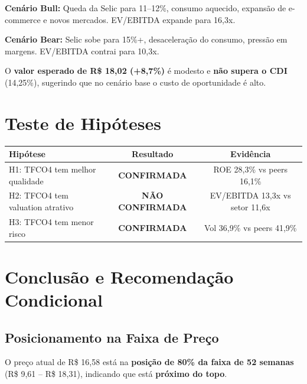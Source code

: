 \documentclass[12pt, a4paper]{article}
\begin{document}
\textbf{Cenário Bull:} Queda da Selic para 11--12\%, consumo aquecido, expansão de e-commerce e novos mercados. EV/EBITDA expande para 16,3x.

\textbf{Cenário Bear:} Selic sobe para 15\%+, desaceleração do consumo, pressão em margens. EV/EBITDA contrai para 10,3x.

O \textbf{valor esperado de R\$ 18,02 (+8,7\%)} é modesto e \textbf{não supera o CDI} (14,25\%), sugerindo que no cenário base o custo de oportunidade é alto.

\section{Teste de Hipóteses}

\begin{center}
\begin{tabular}{lcc}
\toprule
\textbf{Hipótese} & \textbf{Resultado} & \textbf{Evidência} \\
\midrule
H1: TFCO4 tem melhor qualidade & \textcolor{verdepositivo}{\textbf{CONFIRMADA}} & ROE 28,3\% vs peers 16,1\% \\
H2: TFCO4 tem valuation atrativo & \textcolor{vermelhoneg}{\textbf{NÃO CONFIRMADA}} & EV/EBITDA 13,3x vs setor 11,6x \\
H3: TFCO4 tem menor risco & \textcolor{verdepositivo}{\textbf{CONFIRMADA}} & Vol 36,9\% vs peers 41,9\% \\
\bottomrule
\end{tabular}
\end{center}

\section{Conclusão e Recomendação Condicional}

\subsection{Posicionamento na Faixa de Preço}

O preço atual de R\$ 16,58 está na \textbf{posição de 80\% da faixa de 52 semanas} (R\$ 9,61 -- R\$ 18,31), indicando que está \textcolor{vermelhoneg}{\textbf{próximo do topo}}.
\end{document}
